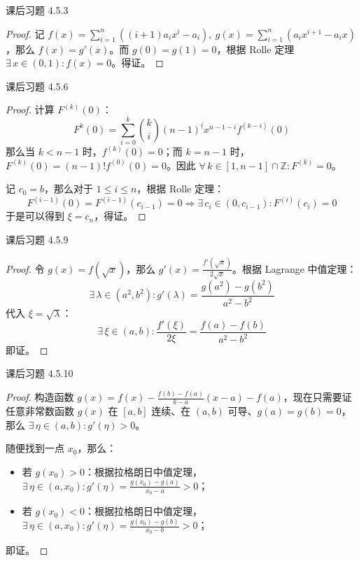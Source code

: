 \begin{problem}
	课后习题 4.5.3

	\begin{proof}
		记 $f(x) = \sum_{i=1}^n ((i+1) a_i x^i - a_i),\ g(x) = \sum_{i=1}^n (a_i x^{i+1} - a_i x)$，那么 $f(x) = g'(x)$。而 $g(0) = g(1) = 0$，根据 Rolle 定理 $\exists\,x \in (0, 1): f(x) = 0$。得证。
	\end{proof}
\end{problem}

\begin{problem}
	课后习题 4.5.6

	\begin{proof}
		计算 $F^{(k)}(0)$：
		$$
		F^{k}(0) = \sum_{i=0}^{k} \binom{k}{i} (n-1)^{\underline{i}} x^{n-1-i} f^{(k-i)}(0)
		$$
		那么当 $k < n - 1$ 时，$f^{(k)}(0) = 0$；而 $k = n - 1$ 时，$F^{(k)}(0) = (n-1)! f^{(0)}(0) = 0$。因此 $\forall\,k \in [1, n - 1] \cap \mathbb{Z}: F^{(k)} = 0$。

		记 $c_0 = b$，那么对于 $1 \le i \le n$，根据 Rolle 定理：
		$$
		F^{(i-1)}(0) = F^{(i-1)}(c_{i-1}) = 0 \Rightarrow \exists\,c_i \in (0, c_{i-1}): F^{(i)}(c_i) = 0
		$$
		于是可以得到 $\xi = c_n$，得证。
	\end{proof}
\end{problem}

\begin{problem}
	课后习题 4.5.9

	\begin{proof}
		令 $g(x) = f(\sqrt{x})$，那么 $g'(x) = \frac{f'(\sqrt x)}{2 \sqrt x}$。根据 Lagrange 中值定理：
		$$
		\exists\,\lambda \in (a^2, b^2): g'(\lambda) = \frac{g(a^2) - g(b^2)}{a^2 - b^2}
		$$
		代入 $\xi = \sqrt{\lambda}$：
		$$
		\exists\,\xi \in (a, b): \frac{f'(\xi)}{2 \xi} = \frac{f(a) - f(b)}{a^2 - b^2}
		$$
		即证。
	\end{proof}
\end{problem}

\begin{problem}
	课后习题 4.5.10

	\begin{proof}
		构造函数 $g(x) = f(x) - \frac{f(b) - f(a)}{b - a}(x - a) - f(a)$，现在只需要证任意非常数函数 $g(x)$ 在 $[a, b]$ 连续、在 $(a, b)$ 可导、$g(a) = g(b) = 0$，那么 $\exists\,\eta \in (a, b): g'(\eta) > 0$。

		随便找到一点 $x_0$，那么：

		\begin{itemize}
			\item 若 $g(x_0) > 0$：根据拉格朗日中值定理，$\exists\,\eta \in (a, x_0): g'(\eta) = \frac{g(x_0) - g(a)}{x_0 - a} > 0$；
			\item 若 $g(x_0) < 0$：根据拉格朗日中值定理，$\exists\,\eta \in (a, x_0): g'(\eta) = \frac{g(x_0) - g(b)}{x_0 - b} > 0$；
		\end{itemize}

		即证。
	\end{proof}
\end{problem}

